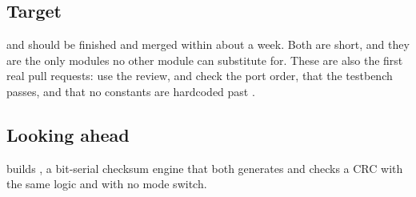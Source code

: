\subsection*{Target}
 and  should be finished and merged within about a week. Both are
short, and they are the only modules no other module can substitute for. These are also the first
real pull requests: use the review, and check the port order, that the testbench passes, and that no
constants are hardcoded past .

\subsection*{Looking ahead}
 builds , a bit-serial checksum engine that both generates and checks a
CRC with the same logic and with no mode switch.

